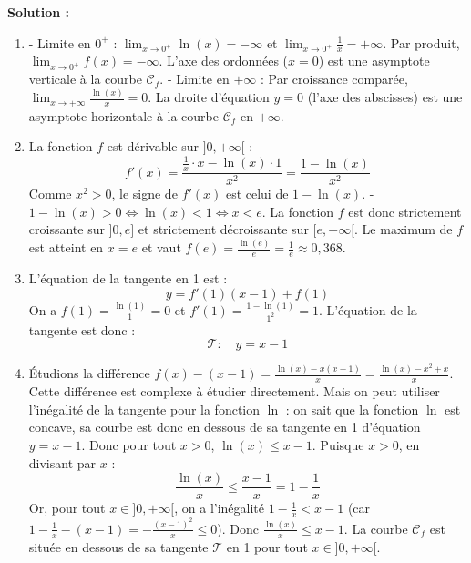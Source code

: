 \textbf{Solution :}
\begin{enumerate}
    \item - Limite en $0^+$ : $\lim_{x \to 0^+} \ln(x) = -\infty$ et $\lim_{x \to 0^+} \frac{1}{x} = +\infty$. Par produit, $\lim_{x \to 0^+} f(x) = -\infty$.
      L'axe des ordonnées ($x=0$) est une asymptote verticale à la courbe $\mathcal{C}_f$.
      - Limite en $+\infty$ : Par croissance comparée, $\lim_{x \to +\infty} \frac{\ln(x)}{x} = 0$.
      La droite d'équation $y=0$ (l'axe des abscisses) est une asymptote horizontale à la courbe $\mathcal{C}_f$ en $+\infty$.
      
    \item La fonction $f$ est dérivable sur $]0, +\infty[$ :
      \[
      f'(x) = \frac{\frac{1}{x} \cdot x - \ln(x) \cdot 1}{x^2} = \frac{1 - \ln(x)}{x^2}
      \]
      Comme $x^2 > 0$, le signe de $f'(x)$ est celui de $1-\ln(x)$.
      - $1 - \ln(x) > 0 \iff \ln(x) < 1 \iff x < e$.
      La fonction $f$ est donc strictement croissante sur $]0, e]$ et strictement décroissante sur $[e, +\infty[$.
      Le maximum de $f$ est atteint en $x = e$ et vaut $f(e) = \frac{\ln(e)}{e} = \frac{1}{e} \approx 0,368$.
      
    \item L'équation de la tangente en 1 est :
      \[
      y = f'(1)(x-1) + f(1)
      \]
      On a $f(1) = \frac{\ln(1)}{1} = 0$ et $f'(1) = \frac{1-\ln(1)}{1^2} = 1$.
      L'équation de la tangente est donc :
      \[
      \mathcal{T} : \quad y = x - 1
      \]
      
    \item Étudions la différence $f(x) - (x-1) = \frac{\ln(x) - x(x-1)}{x} = \frac{\ln(x) - x^2 + x}{x}$.
      Cette différence est complexe à étudier directement. Mais on peut utiliser l'inégalité de la tangente pour la fonction $\ln$ : on sait que la fonction $\ln$ est concave, sa courbe est donc en dessous de sa tangente en 1 d'équation $y = x-1$.
      Donc pour tout $x > 0$, $\ln(x) \le x - 1$.
      Puisque $x > 0$, en divisant par $x$ :
      \[
      \frac{\ln(x)}{x} \le \frac{x-1}{x} = 1 - \frac{1}{x}
      \]
      Or, pour tout $x \in ]0, +\infty[$, on a l'inégalité $1 - \frac{1}{x} < x - 1$ (car $1 - \frac{1}{x} - (x - 1) = -\frac{(x-1)^2}{x} \le 0$).
      Donc $\frac{\ln(x)}{x} \le x-1$.
      La courbe $\mathcal{C}_f$ est située en dessous de sa tangente $\mathcal{T}$ en 1 pour tout $x \in ]0, +\infty[$.
\end{enumerate}

